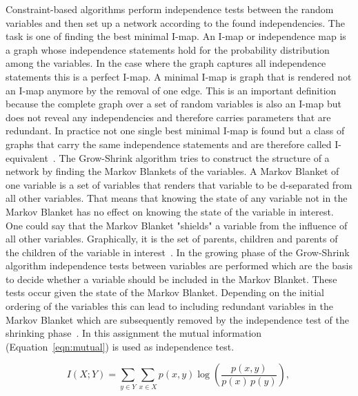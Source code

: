 Constraint-based algorithms perform independence tests between the random variables and then set up a network according to the found independencies. The task is one of finding the best minimal I-map. An I-map or independence map is a graph whose independence statements hold for the probability distribution among the variables. In the case where the graph captures all independence statements this is a perfect I-map. A minimal I-map is graph that is rendered not an I-map anymore by the removal of one edge. This is an important definition because the complete graph over a set of random variables is also an I-map but does not reveal any independencies and therefore carries parameters that are redundant. In practice not one single best minimal I-map is found but a class of graphs that carry the same independence statements and are therefore called I-equivalent~\citep{koller2009}. 
The Grow-Shrink algorithm tries to construct the structure of a network by finding the Markov Blankets of the variables. A Markov Blanket of one variable is a set of variables that renders that variable to be d-separated from all other variables. That means that knowing the state of any variable not in the Markov Blanket has no effect on knowing the state of the variable in interest. One could say that the Markov Blanket "shields" a variable from the influence of all other variables. Graphically, it is the set of parents, children and parents of the children of the variable in interest~\citep{koller2009}. In the growing phase of the Grow-Shrink algorithm independence tests between variables are performed which are the basis to decide whether a variable should be included in the Markov Blanket. These tests occur given the state of the Markov Blanket. Depending on the initial ordering of the variables this can lead to including redundant variables in the Markov Blanket which are subsequently removed by the independence test of the shrinking phase~\citep{margaritis2003}. In this assignment the mutual information (Equation~\ref{eqn:mutual}) is used as independence test.

\begin{equation}
I(X;Y) = \sum_{y \in Y} \sum_{x \in X} 
                 p(x,y) \log{ \left(\frac{p(x,y)}{p(x)\,p(y)}
                              \right) }, \,\! 
\label{eqn:mutual}
\end{equation}

